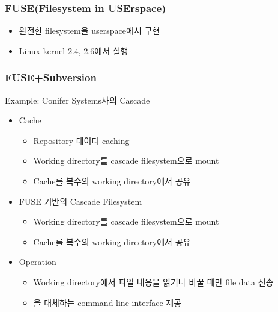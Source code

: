 \begin{frame}
\frametitle{FUSE(Filesystem in USErspace)}

\begin{itemize}
\item 완전한 filesystem을 userspace에서 구현
\item Linux kernel 2.4, 2.6에서 실행
\end{itemize}

\begin{center}
\end{center}


\end{frame}

\begin{frame}[shrink]
\frametitle{FUSE+Subversion}

Example: Conifer Systems사의 Cascade

\begin{center}
\end{center}

\begin{itemize}
\item Cache
  \begin{itemize}
  \item Repository 데이터 caching
  \item Working directory를 cascade filesystem으로 mount
  \item Cache를 복수의 working directory에서 공유
  \end{itemize}
\item FUSE 기반의 Cascade Filesystem
  \begin{itemize}
  \item Working directory를 cascade filesystem으로 mount
  \item Cache를 복수의 working directory에서 공유
  \end{itemize}
\item Operation
  \begin{itemize}
  \item Working directory에서 파일 내용을 읽거나 바꿀 때만 file data 전송 
  \item {}을 대체하는  command line interface 제공
  \end{itemize}
\end{itemize}


\end{frame}
